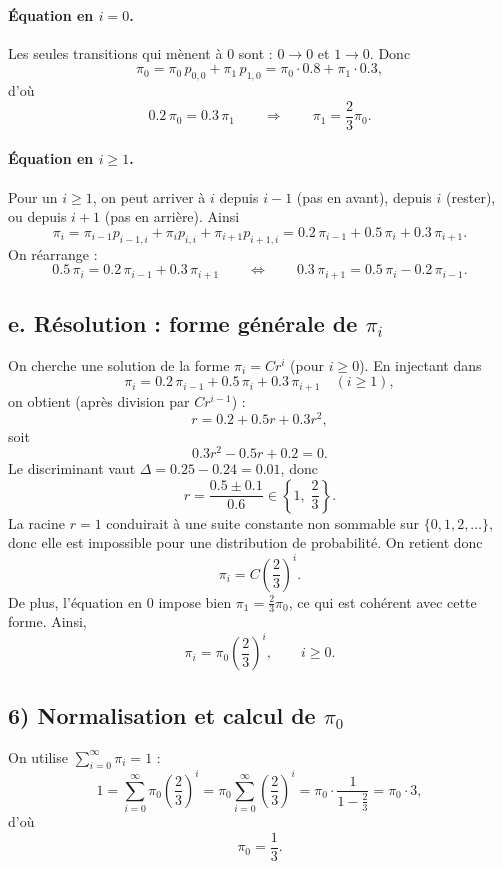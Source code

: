 \paragraph{\'Equation en $i=0$.}
Les seules transitions qui m\`enent \`a $0$ sont : $0\to 0$ et $1\to 0$. Donc
\[
\pi_0=\pi_0\,p_{0,0}+\pi_1\,p_{1,0}
=\pi_0\cdot 0.8+\pi_1\cdot 0.3,
\]
d'o\`u
\[
0.2\,\pi_0=0.3\,\pi_1
\qquad\Longrightarrow\qquad
\pi_1=\frac{2}{3}\pi_0.
\]

\paragraph{\'Equation en $i\ge 1$.}
Pour un $i\ge 1$, on peut arriver \`a $i$ depuis $i-1$ (pas en avant), depuis $i$ (rester), ou depuis $i+1$ (pas en arri\`ere). Ainsi
\[
\pi_i=\pi_{i-1}p_{i-1,i}+\pi_i p_{i,i}+\pi_{i+1}p_{i+1,i}
=0.2\,\pi_{i-1}+0.5\,\pi_i+0.3\,\pi_{i+1}.
\]
On r\'earrange :
\[
0.5\,\pi_i=0.2\,\pi_{i-1}+0.3\,\pi_{i+1}
\qquad\Longleftrightarrow\qquad
0.3\,\pi_{i+1}=0.5\,\pi_i-0.2\,\pi_{i-1}.
\]

\subsection*{e. R\'esolution : forme g\'en\'erale de $\pi_i$}

On cherche une solution de la forme $\pi_i = C r^i$ (pour $i\ge 0$). En injectant dans
\[
\pi_i=0.2\,\pi_{i-1}+0.5\,\pi_i+0.3\,\pi_{i+1}\quad (i\ge 1),
\]
on obtient (apr\`es division par $Cr^{i-1}$) :
\[
r = 0.2 + 0.5 r + 0.3 r^2,
\]
soit
\[
0.3r^2 - 0.5r + 0.2 = 0.
\]
Le discriminant vaut $\Delta = 0.25-0.24=0.01$, donc
\[
r=\frac{0.5\pm 0.1}{0.6}\in\left\{1,\;\frac{2}{3}\right\}.
\]
La racine $r=1$ conduirait \`a une suite constante non sommable sur $\{0,1,2,\dots\}$, donc elle est impossible pour une distribution de probabilit\'e.
On retient donc
\[
\pi_i = C\left(\frac{2}{3}\right)^i.
\]
De plus, l'\'equation en $0$ impose bien $\pi_1=\frac{2}{3}\pi_0$, ce qui est coh\'erent avec cette forme.
Ainsi,
\[
\pi_i=\pi_0\left(\frac{2}{3}\right)^i,\qquad i\ge 0.
\]

\subsection*{6) Normalisation et calcul de $\pi_0$}

On utilise $\sum_{i=0}^\infty \pi_i=1$ :
\[
1=\sum_{i=0}^{\infty}\pi_0\left(\frac{2}{3}\right)^i
=\pi_0\sum_{i=0}^\infty \left(\frac{2}{3}\right)^i
=\pi_0\cdot \frac{1}{1-\frac{2}{3}}
=\pi_0\cdot 3,
\]
d'o\`u
\[
\pi_0=\frac{1}{3}.
\]

